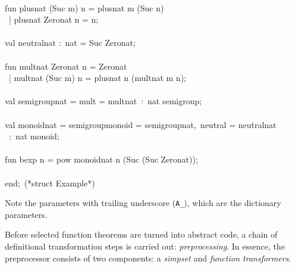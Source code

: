 \begin{isabellebody}
\begin{isamarkuptext}
\hspace*{0pt}\\
\hspace*{0pt}fun plus{}nat (Suc m) n = plus{}nat m (Suc n)\\
\hspace*{0pt} ~| plus{}nat Zero{}nat n = n;\\
\hspace*{0pt}\\
\hspace*{0pt}val neutral{}nat :~nat = Suc Zero{}nat;\\
\hspace*{0pt}\\
\hspace*{0pt}fun mult{}nat Zero{}nat n = Zero{}nat\\
\hspace*{0pt} ~| mult{}nat (Suc m) n = plus{}nat n (mult{}nat m n);\\
\hspace*{0pt}\\
\hspace*{0pt}val semigroup{}nat = {}mult = mult{}nat{}~:~nat semigroup;\\
\hspace*{0pt}\\
\hspace*{0pt}val monoid{}nat = {}semigroup{}monoid = semigroup{}nat,~neutral = neutral{}nat{}\\
\hspace*{0pt} ~:~nat monoid;\\
\hspace*{0pt}\\
\hspace*{0pt}fun bexp n = pow monoid{}nat n (Suc (Suc Zero{}nat));\\
\hspace*{0pt}\\
\hspace*{0pt}end;~(*struct Example*)%
\end{isamarkuptext}%
\isamarkuptrue%
%
\endisatagquote
{\isafoldquote}%
%
\isadelimquote
%
\endisadelimquote
%
\begin{isamarkuptext}%
\noindent Note the parameters with trailing underscore (\verb|A_|),
    which are the dictionary parameters.%
\end{isamarkuptext}%
\isamarkuptrue%
%
\isamarkuptrue%
%
\begin{isamarkuptext}%
Before selected function theorems are turned into abstract
  code, a chain of definitional transformation steps is carried
  out: \emph{preprocessing}.  In essence, the preprocessor
  consists of two components: a \emph{simpset} and \emph{function transformers}.


\end{isamarkuptext}
\end{isabellebody}
